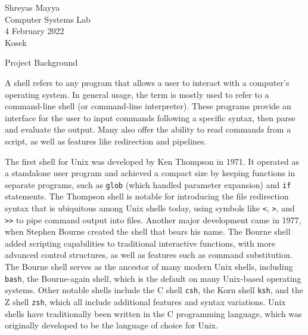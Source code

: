 \documentclass[12pt]{article}
\begin{document}
		\begin{flushleft}
			
			Shreyas Mayya\\
			Computer Systems Lab\\
			4 February 2022\\
			Kosek\\
			
			
			\begin{center}
				{\huge Project Background\par}
			\end{center}
			
			
			\setlength{\parindent}{0pt}
			
			A shell refers to any program that allows a user to interact with a computer's operating system. In general usage, the term is mostly used to refer to a command-line shell (or command-line interpreter). These programs provide an interface for the user to input commands following a specific syntax, then parse and evaluate the output. Many also offer the ability to read commands from a script, as well as features like redirection and pipelines.
			
			The first shell for Unix was developed by Ken Thompson in 1971. It operated as a standalone user program and achieved a compact size by keeping functions in separate programs, such as \verb|glob| (which handled parameter expansion) and \verb|if| statements. The Thompson shell is notable for introducing the file redirection syntax that is ubiquitous among Unix shells today, using symbols like \verb|<|, \verb|>|, and \verb|>>| to pipe command output into files. Another major development came in 1977, when Stephen Bourne created the shell that bears his name. The Bourne shell added scripting capabilities to traditional interactive functions, with more advanced control structures, as well as features such as command substitution. The Bourne shell serves as the ancestor of many modern Unix shells, including \verb|bash|, the Bourne-again shell, which is the default on many Unix-based operating systems. Other notable shells include the C shell \verb|csh|, the Korn shell \verb|ksh|, and the Z shell \verb|zsh|, which all include additional features and syntax variations. Unix shells have traditionally been written in the C programming language, which was originally developed to be the language of choice for Unix.


\end{flushleft}
\end{document}
